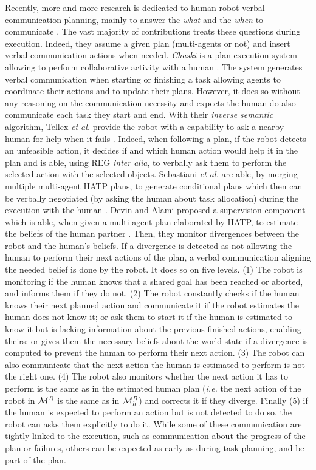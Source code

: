 \documentclass[a4paper,11pt,twoside]{StyleThese}
\begin{document}
Recently, more and more research is dedicated to human robot verbal communication planning, mainly to answer the \textit{what} and the \textit{when} to communicate \cite{mavridis2015review}. The vast majority of contributions treats these questions during execution. Indeed, they assume a given plan (multi-agents or not) and insert verbal communication actions when needed.
\textit{Chaski} is a plan execution system allowing to perform collaborative activity with a human \cite{shah2011improved}. The system generates verbal communication when starting or finishing a task allowing agents to coordinate their actions and to update their plans. However, it does so without any reasoning on the communication necessity and expects the human do also communicate each task they start and end.
With their \textit{inverse semantic} algorithm, Tellex \textit{et al.} provide the robot with a capability to ask a nearby human for help when it fails \cite{tellex2014asking}. Indeed, when following a plan, if the robot detects an unfeasible action, it decides if and which human action would help it in the plan and is able, using REG \textit{inter alia}, to verbally ask them to perform the selected action with the selected objects. 
Sebastiani \textit{et al.} are able, by merging multiple multi-agent HATP plans, to generate conditional plans which then can be verbally negotiated (by asking the human about task allocation) during the execution with the human \cite{sebastiani2017dealing}. 
Devin and Alami proposed a supervision component which is able, when given a multi-agent plan elaborated by HATP, to estimate the beliefs of the human partner \cite{devin2016implemented}. Then, they monitor divergences between the robot and the human's beliefs. If a divergence is detected as not allowing the human to perform their next actions of the plan, a verbal communication aligning the needed belief is done by the robot. It does so on five levels. (1) The robot is monitoring  if the human knows that a shared goal has been reached or aborted, and informs them if they do not. (2) The robot constantly checks if the human knows their next planned action and communicate it if the robot estimates the human does not know it; or ask them to start it if the human is estimated to know it but is lacking information about the previous finished actions, enabling theirs; or gives them the necessary beliefs about the world state if a divergence is computed to prevent the human to perform their next action. (3) The robot can also communicate that the next action the human is estimated to perform is not the right one. (4) The robot also monitors whether the next action it has to perform is the same as in the estimated human plan (\textit{i.e.} the next action of the robot in $\mathcal{M}^R$ is the same as in $\mathcal{M}^R_h$) and corrects it if they diverge. Finally (5) if the human is expected to perform an action but is not detected to do so, the robot can asks them explicitly to do it. While some of these communication are tightly linked to the execution, such as communication about the progress of the plan or failures, others can be expected as early as during task planning, and be part of the plan. 
\end{document}
